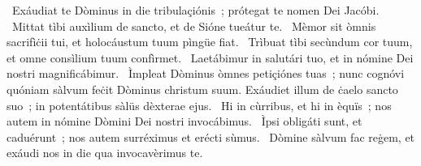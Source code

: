 ~Exáudiat te Dòminus in die tribulaçiónis~; prótegat te nomen Dei Jacóbi. 
~Mittat tìbi auxìlium de sancto, et de Sióne tueátur te. 
~Mèmor sit òmnis sacrifìċii tui, et holocáustum tuum pìngüe fiat. 
~Trìbuat tìbi secùndum cor tuum, et omne consìlium tuum confìrmet. 
~Laetábimur in salutári tuo, et in nómine Dei nostri magnificábimur. 
~Ìmpleat Dòminus òmnes petiçiónes tuas~; nunc cognóvi quóniam sàlvum feċit Dòminus christum suum. Exáudiet illum de ċaelo sancto suo~; in potentátibus sàlüs dèxterae ejus. 
~Hi in cùrribus, et hi in èquïs~; nos autem in nómine Dòmini Dei nostri invocábimus. 
~Ìpsi obligáti sunt, et caduérunt~; nos autem surréximus et erécti sùmus. 
~Dòmine sàlvum fac reġem, et exáudi nos in die qua invocavèrimus te. 
